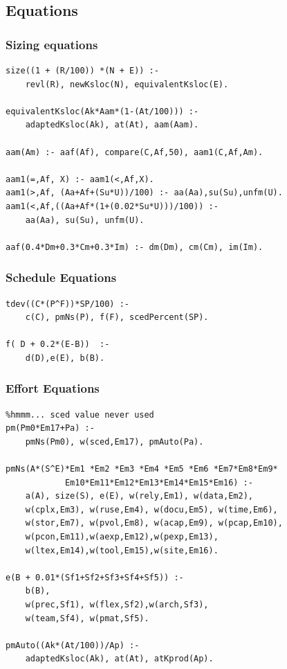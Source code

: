 \documentclass[twocolumn,global]{svjour}
\begin{document}
\subsection{ Equations
}
\subsubsection{ Sizing equations }\begin{Verbatim}
size((1 + (R/100)) *(N + E)) :-
    revl(R), newKsloc(N), equivalentKsloc(E).

equivalentKsloc(Ak*Aam*(1-(At/100))) :-
    adaptedKsloc(Ak), at(At), aam(Aam).

aam(Am) :- aaf(Af), compare(C,Af,50), aam1(C,Af,Am).

aam1(=,Af, X) :- aam1(<,Af,X).
aam1(>,Af, (Aa+Af+(Su*U))/100) :- aa(Aa),su(Su),unfm(U).
aam1(<,Af,((Aa+Af*(1+(0.02*Su*U)))/100)) :-
    aa(Aa), su(Su), unfm(U).

aaf(0.4*Dm+0.3*Cm+0.3*Im) :- dm(Dm), cm(Cm), im(Im).
\end{Verbatim}
\subsubsection{ Schedule Equations }\begin{Verbatim}
tdev((C*(P^F))*SP/100) :-
    c(C), pmNs(P), f(F), scedPercent(SP).

f( D + 0.2*(E-B))  :-
    d(D),e(E), b(B).
\end{Verbatim}
\subsubsection{ Effort Equations }\begin{Verbatim}
%hmmm... sced value never used
pm(Pm0*Em17+Pa) :-
    pmNs(Pm0), w(sced,Em17), pmAuto(Pa).

pmNs(A*(S^E)*Em1 *Em2 *Em3 *Em4 *Em5 *Em6 *Em7*Em8*Em9*
            Em10*Em11*Em12*Em13*Em14*Em15*Em16) :-
    a(A), size(S), e(E), w(rely,Em1), w(data,Em2),
    w(cplx,Em3), w(ruse,Em4), w(docu,Em5), w(time,Em6),
    w(stor,Em7), w(pvol,Em8), w(acap,Em9), w(pcap,Em10),
    w(pcon,Em11),w(aexp,Em12),w(pexp,Em13),
    w(ltex,Em14),w(tool,Em15),w(site,Em16).

e(B + 0.01*(Sf1+Sf2+Sf3+Sf4+Sf5)) :-
    b(B),
    w(prec,Sf1), w(flex,Sf2),w(arch,Sf3),
    w(team,Sf4), w(pmat,Sf5).

pmAuto((Ak*(At/100))/Ap) :-
    adaptedKsloc(Ak), at(At), atKprod(Ap).
\end{Verbatim}
\end{document}
